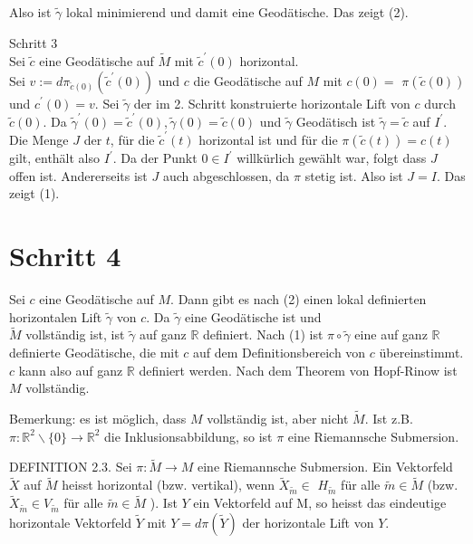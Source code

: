 \documentclass[10pt]{article}
\begin{document}
Also ist $\tilde{\gamma}$ lokal minimierend und damit eine Geodätische. Das zeigt (2).

Schritt 3\\
Sei $\tilde{c}$ eine Geodätische auf $\tilde{M}$ mit $\tilde{c}^{\prime}(0)$ horizontal.\\
Sei $v:=d \pi_{\tilde{c}(0)}\left(\tilde{c}^{\prime}(0)\right)$ und $c$ die Geodätische auf $M$ mit $c(0)=$ $\pi(\tilde{c}(0))$ und $c^{\prime}(0)=v$. Sei $\tilde{\gamma}$ der im 2. Schritt konstruierte horizontale Lift von $c$ durch $\tilde{c}(0)$. Da $\tilde{\gamma}^{\prime}(0)=\tilde{c}^{\prime}(0), \tilde{\gamma}(0)=\tilde{c}(0)$ und $\tilde{\gamma}$ Geodätisch ist $\tilde{\gamma}=\tilde{c}$ auf $I^{\prime}$. Die Menge $J$ der $t$, für die $\tilde{c}^{\prime}(t)$ horizontal ist und für die $\pi(\tilde{c}(t))=c(t)$ gilt, enthält also $I^{\prime}$. Da der Punkt $0 \in I^{\prime}$ willkürlich gewählt war, folgt dass $J$ offen ist. Andererseits ist $J$ auch abgeschlossen, da $\pi$ stetig ist. Also ist $J=I$. Das zeigt (1).

\section*{Schritt 4}
Sei $c$ eine Geodätische auf $M$. Dann gibt es nach (2) einen lokal definierten horizontalen Lift $\tilde{\gamma}$ von $c$. Da $\tilde{\gamma}$ eine Geodätische ist und\\
$\tilde{M}$ vollständig ist, ist $\tilde{\gamma}$ auf ganz $\mathbb{R}$ definiert. Nach (1) ist $\pi \circ \tilde{\gamma}$ eine auf ganz $\mathbb{R}$ definierte Geodätische, die mit $c$ auf dem Definitionsbereich von $c$ übereinstimmt. $c$ kann also auf ganz $\mathbb{R}$ definiert werden. Nach dem Theorem von Hopf-Rinow ist $M$ vollständig.

Bemerkung: es ist möglich, dass $M$ vollständig ist, aber nicht $\tilde{M}$. Ist z.B. $\pi: \mathbb{R}^{2} \backslash\{0\} \rightarrow \mathbb{R}^{2}$ die Inklusionsabbildung, so ist $\pi$ eine Riemannsche Submersion.

DEFINITION 2.3. Sei $\pi: \tilde{M} \rightarrow M$ eine Riemannsche Submersion. Ein Vektorfeld $\tilde{X}$ auf $\tilde{M}$ heisst horizontal (bzw. vertikal), wenn $\tilde{X}_{\tilde{m}} \in$ $H_{\tilde{m}}$ für alle $\tilde{m} \in \tilde{M}$ (bzw. $\tilde{X}_{\tilde{m}} \in V_{\tilde{m}}$ für alle $\tilde{m} \in \tilde{M}$ ). Ist $Y$ ein Vektorfeld auf M, so heisst das eindeutige horizontale Vektorfeld $\tilde{Y}$ mit $Y=d \pi(\tilde{Y})$ der horizontale Lift von $Y$.
\end{document}
